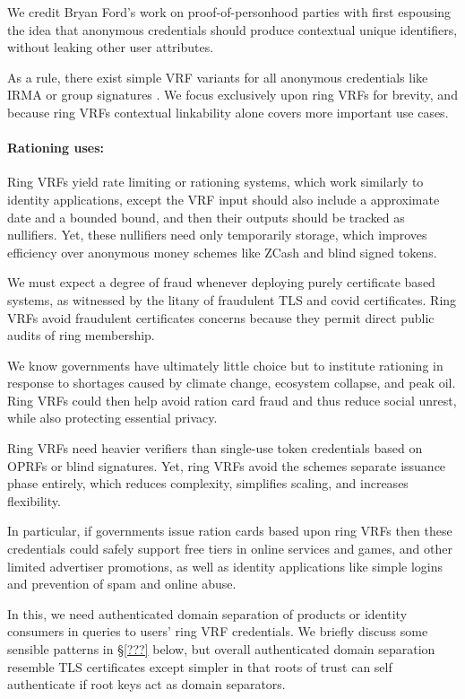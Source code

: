 We credit Bryan Ford's work on proof-of-personhood parties \cite{pop2008,pop2017}
with first espousing the idea that anonymous credentials should produce
contextual unique identifiers, without leaking other user attributes.

As a rule, there exist simple VRF variants for all anonymous credentials
like IRMA \cite{IRMA_credentials} or group signatures \cite{group_sig_survey}.
We focus exclusively upon ring VRFs for brevity, and because ring VRFs
contextual linkability alone covers more important use cases.


\paragraph{Rationing uses:}

Ring VRFs yield rate limiting or rationing systems, which work
similarly to identity applications, except the VRF input should also
include a approximate date and a bounded bound, and
 then their outputs should be tracked as nullifiers.
Yet, these nullifiers need only temporarily storage, which improves 
efficiency over anonymous money schemes like ZCash and blind signed tokens.

We must expect a degree of fraud whenever deploying purely certificate
based systems, as witnessed by the litany of fraudulent TLS and covid
certificates.  Ring VRFs avoid fraudulent certificates concerns because
they permit direct public audits of ring membership.

We know governments have ultimately little choice but to institute
rationing in response to shortages caused by climate change, ecosystem
collapse, and peak oil.  Ring VRFs could then help avoid ration card
fraud and thus reduce social unrest, while also protecting essential privacy.

Ring VRFs need heavier verifiers than single-use token credentials
based on OPRFs \cite{PrivacyPass} or blind signatures.
Yet, ring VRFs avoid the schemes separate issuance phase entirely,
which reduces complexity, simplifies scaling, and increases flexibility.

In particular, if governments issue ration cards based upon ring VRFs
then these credentials could safely support free tiers in online services
and games, and other limited advertiser promotions, as well as identity
applications like simple logins and prevention of spam and online abuse.

In this, we need authenticated domain separation of products or identity
consumers in queries to users' ring VRF credentials.  We briefly discuss
some sensible patterns in \S\ref{???} below, but overall authenticated
domain separation resemble TLS certificates except simpler in that
roots of trust can self authenticate if root keys act as domain separators.



\endinput

